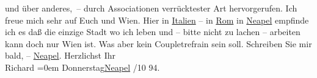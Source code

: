 \begin{ledgroupsized}[t]{13cm}
               und über anderes, – durch Associationen verrücktester Art hervorgerufen.\pend
           \pstart
           Ich freue mich sehr auf Euch und Wien. Hier in \uline{Italien} – in \uline{Rom} in \uline{Neapel} empfinde ich es daß die einzige Stadt wo ich leben {\pb}und – bitte nicht zu lachen –
               arbeiten kann doch nur Wien ist. Was aber kein
               Coupletrefrain sein soll. Schreiben Sie mir bald, – \uline{Neapel}.\pend
           \pstart
           Herzlichst Ihr{\\[\baselineskip]}\spacefill\mbox{Richard}\pend
           \leftskip=0em{}\pstart
           Donnerstag\hspace*{1.5em}\uline{Neapel}\pend
           /10 94.\pend
           \endnumbering{}\end{ledgroupsized}  \newcommand{\dateiname}{L00384}\newcommand{\titel}{Richard Beer-Hofmann an Arthur Schnitzler, 18. 10. 1894}\newcommand{\editorInnen}{Martin Anton Müller und Gerd-Hermann Susen}
            \footnotesize
\begin{ledgroupsized}[t]{11.5cm}
\end{ledgroupsized}
         
      